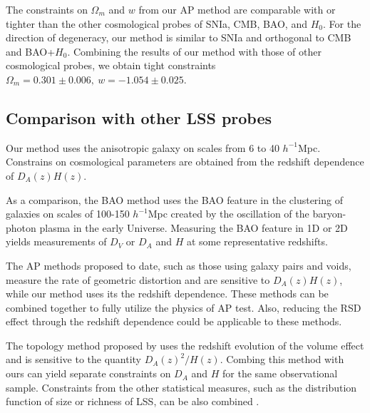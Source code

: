\documentclass[iop]{emulateapj}
\begin{document}
The constraints on $\Omega_m$ and $w$ from our AP method are comparable with or tighter %
than the other cosmological probes of SNIa, CMB, BAO, and $H_0$.
For the direction of degeneracy, %
our method is similar to SNIa and orthogonal to CMB and BAO+$H_0$.
Combining the results of our method with those of other cosmological probes, 
we obtain tight constraints 
$\Omega_m = 0.301 \pm 0.006,\ w=-1.054 \pm 0.025$.


\subsection{Comparison with other LSS probes}

Our method uses the anisotropic galaxy on scales from 6 to 40 $h^{-1}$Mpc.
Constrains on cosmological parameters are obtained from the redshift dependence of $D_A(z) H(z)$.

As a comparison, the BAO method uses the BAO feature in the 
clustering of galaxies on scales of 100-150 $h^{-1}$Mpc 
created by the oscillation of the baryon-photon plasma in the early Universe.
Measuring the BAO feature in 1D or 2D yields measurements of $D_V$ or $D_A$ and $H$ at some representative redshifts.

The AP methods proposed to date, such as those using 
galaxy pairs and voids, measure the rate of geometric distortion and are sensitive to $D_A(z) H(z)$,
while our method uses its the redshift dependence.
These methods can be combined together to fully utilize the physics of AP test.
Also, reducing the RSD effect 
through the redshift dependence could be 
applicable to these methods.

The topology method proposed by \cite{topology} 
uses the redshift evolution of the volume effect and is sensitive to the quantity $D_A(z)^2 / H(z)$.
Combing this method with ours can yield separate constraints on $D_A$ and $H$ 
for the same observational sample.
Constraints from the other statistical measures,
such as the distribution function of size or richness of LSS,
can be also combined \citep{Park2012,Park2015}.
\end{document}
